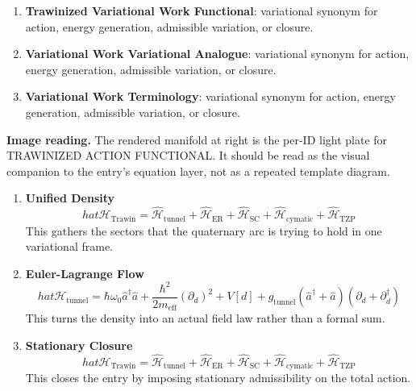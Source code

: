 \begin{enumerate}[leftmargin=1.6em,itemsep=6pt,topsep=4pt]
\item \textbf{Trawinized Variational Work Functional}: variational synonym for action, energy generation, admissible variation, or closure.
\item \textbf{Variational Work Variational Analogue}: variational synonym for action, energy generation, admissible variation, or closure.
\item \textbf{Variational Work Terminology}: variational synonym for action, energy generation, admissible variation, or closure.
\end{enumerate}

\begin{samepage}
\noindent\begin{minipage}[t]{0.45\linewidth}
\vspace{0pt}
\raggedright
\scriptsize\textbf{Image reading.} The rendered manifold at right is the per-ID light plate for TRAWINIZED ACTION FUNCTIONAL. It should be read as the visual companion to the entry's equation layer, not as a repeated template diagram.\par
\end{minipage}\hfill
\begin{minipage}[t]{0.53\linewidth}
\vspace*{-0.10in}
\raggedright
{}
\end{minipage}
\end{samepage}

\clearpage


\begin{enumerate}[leftmargin=1.6em,itemsep=9pt,topsep=6pt]
\item \textbf{Unified Density}
\[
hat{\mathcal{H}}_{\text{Trawin}} = \hat{\mathcal{H}}_{\text{tunnel}} + \hat{\mathcal{H}}_{\text{ER}} + \hat{\mathcal{H}}_{\text{SC}} + \hat{\mathcal{H}}_{\text{cymatic}} + \hat{\mathcal{H}}_{\text{TZP}}
\]
This gathers the sectors that the quaternary arc is trying to hold in one variational frame.

\item \textbf{Euler-Lagrange Flow}
\[
hat{\mathcal{H}}_{\text{tunnel}} = \hbar \omega_0 \hat{a}^\dagger \hat{a} + \frac{\hbar^2}{2m_{\text{eff}}} (\partial_d)^2 + V[d] + g_{\text{tunnel}} (\hat{a}^\dagger + \hat{a})(\partial_d + \partial_d^\dagger)
\]
This turns the density into an actual field law rather than a formal sum.

\item \textbf{Stationary Closure}
\[
hat{\mathcal{H}}_{\text{Trawin}} = \hat{\mathcal{H}}_{\text{tunnel}} + \hat{\mathcal{H}}_{\text{ER}} + \hat{\mathcal{H}}_{\text{SC}} + \hat{\mathcal{H}}_{\text{cymatic}} + \hat{\mathcal{H}}_{\text{TZP}}
\]
This closes the entry by imposing stationary admissibility on the total action.
\end{enumerate}

